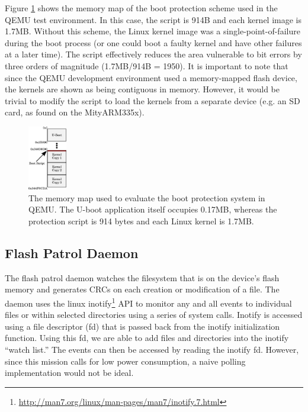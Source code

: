 Figure \ref{fig:mem_map} shows the memory map of the boot protection scheme
used in the QEMU test environment.  In this case, the script is 914B and each
kernel image is 1.7MB.  Without this scheme, the Linux kernel image was a
single-point-of-failure during the boot process (or one could boot a faulty
kernel and have other failures at a later time).  The script effectively reduces
the area vulnerable to bit errors by three orders of magnitude (1.7MB/914B =
1950).  It is important to note that since the QEMU development environment used
a memory-mapped flash device, the kernels are shown as being contiguous in
memory.  However, it would be trivial to modify the script to load the kernels
from a separate device (e.g. an SD card, as found on the MityARM335x).


\begin{figure}
  \centering
  \includegraphics[width=0.15\textwidth]{images/mem_map}
  \caption{The memory map used to evaluate the boot protection system in QEMU.
           The U-boot application itself occupies 0.17MB, whereas the protection
           script is 914 bytes and each Linux kernel is
           1.7MB.}\label{fig:mem_map}
\end{figure}

\subsection{Flash Patrol Daemon}
The flash patrol daemon watches the filesystem that is on the device's flash memory and 
generates CRCs on each creation or modification of a file. The daemon uses the linux 
inotify\footnote{\url{http://man7.org/linux/man-pages/man7/inotify.7.html}} API 
to monitor any and all events to individual files or within selected directories 
using a series of system calls. Inotify is accessed using a file descriptor (fd)
that is passed back from the inotify initialization function. Using this fd, we are able to add files 
and directories into the inotify ``watch list.'' The events can then be accessed 
by reading the inotify fd. However, since this mission calls for low power 
consumption, a naive polling implementation would not be ideal.

